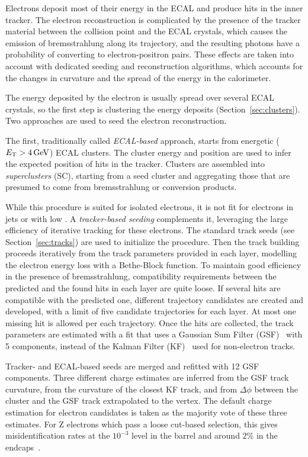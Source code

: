 \label{sec:eleReco}
Electrons deposit most of their energy in the ECAL and produce hits in the inner tracker.
The electron reconstruction is complicated by the presence of the tracker material between the collision point and the ECAL crystals,
which causes the emission of bremsstrahlung along its trajectory, and the resulting photons have a probability of converting to electron-positron pairs.
These effects are taken into account with dedicated seeding and reconstruction algorithms,
which accounts for the changes in curvature and the spread of the energy in the calorimeter.

The energy deposited by the electron is usually spread over several ECAL crystals, so the first step is clustering the energy deposits (Section~\ref{sec:clusters}).
Two approaches are used to seed the electron reconstruction.

The first, traditionally called \textit{ECAL-based} approach, starts from energetic ($E_{\mathrm{T}} > 4\,\text{Ge\hspace{-.08em}V}$) ECAL clusters.
The cluster energy and position are used to infer the expected position of hits in the tracker.
Clusters are assembled into \textit{superclusters} (SC),
starting from a seed cluster and aggregating those that are presumed to come from bremsstrahlung or conversion products.

While this procedure is suited for isolated electrons, it is not fit for electrons in jets or with low \pt.
A \textit{tracker-based seeding} complements it, leveraging the large efficiency of iterative tracking for these electrons.
The standard track seeds (see Section~\ref{sec:tracks}) are used to initialize the procedure.
Then the track building proceeds iteratively from the track parameters provided in each layer, modelling the electron energy loss with a Bethe-Block function.
To maintain good efficiency in the presence of bremsstrahlung, compatibility requirements between the predicted and the found hits in each layer are quite loose.
If several hits are compatible with the predicted one, different trajectory candidates are created and developed,
with a limit of five candidate trajectories for each layer.
At most one missing hit is allowed per each trajectory.
Once the hits are collected, the track parameters are estimated with a fit that uses a Gaussian Sum Filter (GSF)~\cite{CMS-NOTE-2005-001} with 5 components,
instead of the Kalman Filter (KF)~\cite{billoir.qian:simultaneous} used for non-electron tracks.

Tracker- and ECAL-based seeds are merged and refitted with 12 GSF components.
Three different charge estimates are inferred from the GSF track curvature,
from the curvature of the closest KF track, and from $\Delta\phi$ between the cluster and the GSF track extrapolated to the vertex.
The default charge estimation for electron candidates is taken as the majority vote of these three estimates.
For Z electrons which pass a loose cut-based selection, this gives misidentification rates at the $10^{-3}$ level in the barrel
and around 2\usep\% in the endcaps~\cite{Rembser_2019}.
